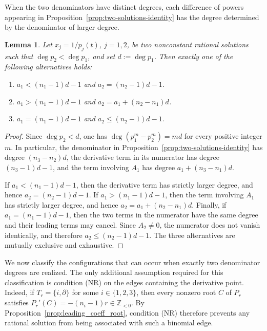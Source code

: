\documentclass[12pt,a4paper]{amsart}
\numberwithin{theorem}{section}
\newtheorem{lemma}[theorem]{Lemma}
\theoremstyle{definition}
\begin{document}
	When the two denominators have distinct degrees, each difference of
	powers appearing in Proposition~\ref{prop:two-solutions-identity}
	has the degree determined by the denominator of larger degree.
	
	\begin{lemma}\label{lem:maximal-degree-trichotomy}
		Let $x_j=1/p_j(t)$, $j=1,2$, be two nonconstant rational solutions such that $\deg p_2<\deg p_1$, and set $d:=\deg p_1$. Then exactly one of the following alternatives holds:
		\begin{enumerate}[(C1)]
			\item $a_1<(n_1-1)d-1$ and $a_2=(n_2-1)d-1$.
			\item $a_1>(n_1-1)d-1$ and $a_2=a_1+(n_2-n_1)d$.
			\item $a_1=(n_1-1)d-1$ and $a_2\leq(n_2-1)d-1$.
		\end{enumerate}
	\end{lemma}
	
	\begin{proof}
		Since $\deg p_2<d$, one has $\deg(p_1^m-p_2^m)=md$ for every positive integer $m$. In particular, the denominator in Proposition~\ref{prop:two-solutions-identity} has degree $(n_3-n_2)d$, the derivative term in its numerator has degree $(n_3-1)d-1$, and the term involving $A_1$ has degree $a_1+(n_3-n_1)d$.
		
		If $a_1<(n_1-1)d-1$, then the derivative term has strictly larger degree, and hence $a_2=(n_2-1)d-1$. If $a_1>(n_1-1)d-1$, then the term involving $A_1$ has strictly larger degree, and hence $a_2=a_1+(n_2-n_1)d$. Finally, if $a_1=(n_1-1)d-1$, then the two terms in the numerator have the same degree and their leading terms may cancel. Since $A_2\neq0$, the numerator does not vanish identically, and therefore $a_2\leq(n_2-1)d-1$. The three alternatives are mutually exclusive and exhaustive.
	\end{proof}
	
	We now classify the configurations that can occur when exactly two denominator degrees are realized. The only additional assumption required for this classification is condition {\rm (NR)} on the edges containing the derivative point. Indeed, if $T_r=\{i,\partial\}$ for some $i\in\{1,2,3\}$, then every nonzero root $C$ of $P_r$ satisfies $P_r'(C)=-(n_i-1)r\in\mathbb{Z}_{<0}$. By Proposition~\ref{prop:leading_coeff_root}, condition {\rm (NR)} therefore prevents any rational solution from being associated with such a binomial edge.
	
\end{document}
